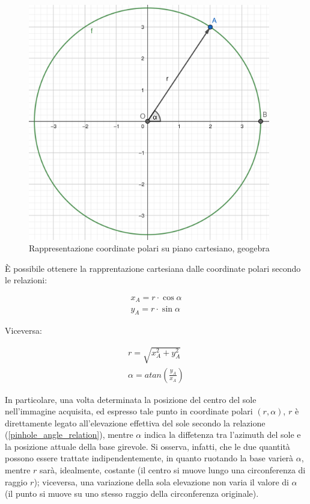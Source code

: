 \documentclass[12pt]{article}
\begin{document}
    \begin{figure}[h]
    \centering
        \includegraphics[width=300pt]{Draws/geogebra-export_polar_circle.png}
        \caption{Rappresentazione coordinate polari su piano cartesiano, geogebra}
    \end{figure}
    
    \noindent
    È possibile ottenere la rapprentazione cartesiana dalle coordinate polari secondo le relazioni:
    
    \begin{equation}
        \begin{split}
        x_A = r \cdot \cos\alpha \\
        y_A = r \cdot  \sin\alpha
        \end{split}
    \end{equation}
    
    \noindent
    Viceversa:
    
    \begin{equation}
        \begin{split}
        r = \sqrt{x_A^2 + y_A^2} \\
        \alpha = atan \left(\frac{y_A}{x_A} \right)
        \end{split}
    \end{equation}
    
    \noindent
    In particolare, una volta determinata la posizione del centro del sole nell'immagine acquisita, ed espresso tale punto in coordinate polari $(r, \alpha)$, $r$ è direttamente legato all'elevazione effettiva del sole secondo la relazione (\ref{pinhole_angle_relation}), mentre $\alpha$ indica la diffetenza tra l'azimuth del sole e la posizione attuale della base girevole. Si osserva, infatti, che le due quantità possono essere trattate indipendentemente, in quanto ruotando la base varierà $\alpha$, mentre $r$ sarà, idealmente, costante (il centro si muove lungo una circonferenza di raggio $r$); viceversa, una variazione della sola elevazione non varia il valore di $\alpha$ (il punto si muove su uno stesso raggio della circonferenza originale).
    
\end{document}
